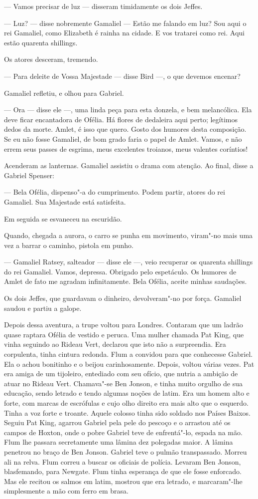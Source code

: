 --- Vamos precisar de luz --- disseram timidamente os dois Jeffes.

--- Luz? --- disse nobremente Gamaliel --- Estão me falando em luz? Sou aqui o rei
Gamaliel, como Elizabeth é rainha na cidade. E vos tratarei como rei. Aqui
estão quarenta shillings.

Os atores desceram, tremendo.

--- Para deleite de Vossa Majestade --- disse Bird ---, o que devemos encenar?

Gamaliel refletiu, e olhou para Gabriel.

--- Ora --- disse ele ---, uma linda peça para esta donzela, e bem melancólica. Ela
deve ficar encantadora de Ofélia. Há flores de dedaleira aqui perto;
legítimos dedos da morte. Amlet, é isso que quero. Gosto dos humores desta
composição. Se eu não fosse Gamaliel, de bom grado faria o papel de Amlet.
Vamos, e não errem seus passes de esgrima, meus excelentes troianos, meus
valentes coríntios!

Acenderam as lanternas. Gamaliel assistiu o drama com atenção. Ao final,
disse a Gabriel Spenser:

--- Bela Ofélia, dispenso"-a do cumprimento. Podem partir, atores do rei
Gamaliel. Sua Majestade está satisfeita.

Em seguida se esvaneceu na escuridão.

Quando, chegada a aurora, o carro se punha em movimento, viram"-no mais uma
vez a barrar o caminho, pistola em punho.

--- Gamaliel Ratsey, salteador --- disse ele ---, veio recuperar os quarenta
shillings do rei Gamaliel. Vamos, depressa. Obrigado pelo espetáculo. Os
humores de Amlet de fato me agradam infinitamente. Bela Ofélia, aceite
minhas saudações.

Os dois Jeffes, que guardavam o dinheiro, devolveram"-no por força. Gamaliel
saudou e partiu a galope.

Depois dessa aventura, a trupe voltou para Londres. Contaram que um ladrão
quase raptara Ofélia de vestido e peruca. Uma mulher chamada Pat King, que
vinha seguindo ao Rideau Vert, declarou que isto não a surpreendia. Era
corpulenta, tinha cintura redonda. Flum a convidou para que conhecesse
Gabriel. Ela o achou bonitinho e o beijou carinhosamente. Depois, voltou
várias vezes. Pat era amiga de um tijoleiro, entediado com seu
ofício, que nutria a ambição de atuar no Rideau Vert. Chamava"-se Ben
Jonson, e tinha muito orgulho de sua educação, sendo letrado e tendo
algumas noções de latim. Era um homem alto e forte, com marcas de
escrófulas e cujo olho direito era mais alto que o esquerdo. Tinha a voz
forte e troante. Aquele colosso tinha sido soldado nos Países Baixos.
Seguiu Pat King, agarrou Gabriel pela pele do pescoço e o arrastou até os
campos de Hoxton, onde o pobre Gabriel teve de enfrentá"-lo, espada na mão.
Flum lhe passara secretamente uma lâmina dez polegadas maior. A lâmina
penetrou no braço de Ben Jonson. Gabriel teve o pulmão transpassado.
Morreu ali na relva. Flum correu a buscar os oficiais de polícia. Levaram
Ben Jonson, blasfemando, para Newgate. Flum tinha esperança de que ele
fosse enforcado. Mas ele recitou os salmos em latim, mostrou que era
letrado, e marcaram"-lhe simplesmente a mão com ferro em brasa.

